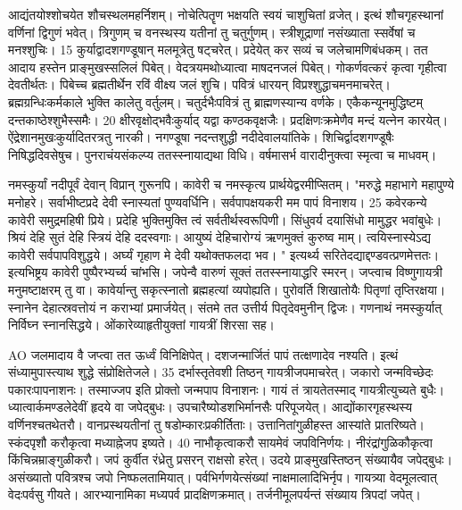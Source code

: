 आद्यंतयोश्शोचयेत शौचस्थलमहर्निशम्।
 नोचेत्पितॄण भक्षयति स्वयं चाशुचितां व्रजेत्।
 इत्थं शौचगृहस्थानां वर्णिनां द्विगुणं भवेत्।
 त्रिगुणम् च वनस्थस्य यतीनां तु चतुर्गुणम्।
 स्त्रीशूद्राणां नसंख्याता स्सर्वेषां च मनश्शुचिः।
 15 कुर्याद्वादशगण्डूषान् मलमूत्रेतु षट्चरेत्।
 प्रदेयेत् कर सव्यं च जलेचामणिबंधकम्।
 तत आदाय हस्तेन प्राङ्मुखस्सलिलं पिबेत्।
 वेदत्रयमथोध्यात्वा माषदनजलं पिबेत्।
 गोकर्णवत्करं कृत्वा गृहीत्वा देवतीर्थतः।
 पिबेच्च ब्रह्मतीर्थेन रविं वीक्ष्य जलं शुचि।
 पवित्रं धारयन् विप्रश्शुद्धाचमनमाचरेत्।
 ब्रह्मग्रन्धिःकर्मकाले भुक्ति कालेतु वर्तुलम्।
 चतुर्दभैःपवित्रं तु ब्राह्मणस्यान्य वर्णके।
 एकैकन्यूनमुद्धिष्टम् दन्तकाष्ठेश्शुभैस्समैः।
 20 क्षीरवृक्षोद्भवैःकुर्याद् यद्वा कण्ठकवृक्षजैः।
 प्रदक्षिणःक्रमेणैव मन्दं यत्नेन कारयेत्।
 ऐंद्रेशानमुखःकुर्यादितरत्रतु नारकी।
 नगण्डूषा नदन्तशुद्धी नदीदेवालयांतिके।
 शिचिर्द्वादशगण्डूषैः निषिद्धदिवसेषुच।
 पुनराचंयसंकल्प्य ततस्स्नायाद्यथा विधि।
 वर्षमासर्भ वारादीनुक्त्वा स्मृत्वा च माधवम्।
 
नमस्कुर्यां नदीपूर्वं देवान् विप्रान् गुरूनपि।
 कावेरी च नमस्कृत्य प्रार्थयेद्वरमीप्सितम्।
 "मरुद्धे महाभागे महापुण्ये मनोहरे।
 सर्वाभीष्टप्रदे देवी स्नास्यतां पुण्यवर्धिनि।
 सर्वपापक्षयकरी मम पापं विनाशय।
 25 कवेरकन्ये कावेरी समुद्रमहिषी प्रिये।
 प्रदेहि भुक्तिमुक्ति त्वं सर्वतीर्थस्वरूपिणी।
 सिंधुवर्य दयासिंधो मामुद्धर भवांबुधेः।
 श्रियं देहि सुतं देहि स्त्रियं देहि ददस्वगाः।
 आयुष्यं देहिचारोग्यं ऋणमुक्तं कुरुष्व माम्।
 त्वयिस्नास्येऽद्य कावेरी सर्वपापविशुद्धये।
 अर्घ्यं गृहाण मे देवी यथोक्तफलदा भव।
 " इत्यर्थ्य सरितेदद्याद्दण्डवत्प्रणमेत्ततः।
 इत्यभिष्ट्रय कावेरी पुष्पैरभ्यर्च्य चांभसि।
 जपेन्वै वारुणं सूक्तं ततस्स्नायाद्धरि स्मरन्।
 जप्त्वाच विष्णुगायत्री मनुमष्टाक्षरम् तु वा।
 कावेर्यान्तु सकृत्स्नातो ब्रह्महत्यां व्यपोह्यति।
 पुरोवर्ति शिखातोयैः पितृणां तृप्तिरक्षया।
 स्नानेन देहात्स्रवत्तोयं न कराभ्यां प्रमार्जयेत्।
 संतमे तत उत्तीर्य पितृदेवमुनीन् द्विजः।
 गणनाथं नमस्कुर्यात् निर्विघ्न स्नानसिद्धये।
 ओंकारेव्याहृतीयुक्तां गायत्रीं शिरसा सह।
 
AO
जलमादाय वै जप्त्वा तत ऊर्ध्वं विनिक्षिपेत्।
 दशजन्मार्जितं पापं तत्क्षणादेव नश्यति।
 इत्थं संध्यामुपास्त्याथ शुद्धे संप्रोक्षितेजले।
 35 दर्भास्तृतेवशी तिष्ठन् गायत्रीजपमाचरेत्।
 जकारो जन्मविच्छेदः पकारःपापनाशनः।
 तस्माज्जप इति प्रोक्तो जन्मपाप विनाशनः।
 गायं तं त्रायतेतस्माद् गायत्रीत्युच्यते बुधैः।
 ध्यात्वार्कमण्डलेदेवीं हृदये वा जपेद्बुधः।
 उपचारैष्योडशभिर्मानसैः परिपूजयेत्।
 आद्योंकारगृहस्थस्य वर्णिनश्चतथेतरौ।
 वानप्रस्थयतीनां तु षडोम्कारःप्रकीर्तिताः।
 उत्तानितांगुळीहस्त आस्यांते प्रातरिष्यते।
 स्कंदपृशौ करौकृत्वा मध्याह्नेजप इष्यते।
 40 नाभौकृत्वाकरौ सायमेवं जपविनिर्णयः।
 नीरंद्रांगुळिकौकृत्वा किंचिन्नम्राङ्गुळीकरौ।
 जपं कुर्वीत रंध्रेतु प्रसरन् राक्षसो हरेत्।
 उदये प्राङ्मुखस्तिष्ठन् संख्यायैव जपेद्बुधः।
 असंख्यातो पवित्रश्च जपो निष्फलतामियात्।
 पर्वभिर्गणयेत्संख्यां नाक्षमालादिभिर्नृप।
 गायत्र्या वेदमूलत्वात् वेदःपर्वसु गीयते।
 आरभ्यानामिका मध्यपर्व प्रादक्षिणक्रमात्।
 तर्जनीमूलपर्यन्तं संख्याय त्रिपदां जपेत्।
 
